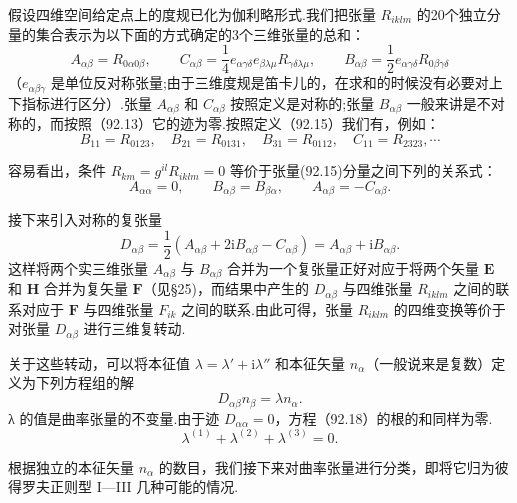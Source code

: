 假设四维空间给定点上的度规已化为伽利略形式.我们把张量 $R_{iklm}$ 的20个独立分量的集合表示为以下面的方式确定的3个三维张量的总和：
\begin{equation}
  A_{\alpha\beta}=R_{0\alpha 0\beta},\qquad
  C_{\alpha\beta}=\frac{1}{4}e_{\alpha\gamma\delta}e_{\beta\lambda\mu}
  R_{\gamma\delta\lambda\mu},\qquad
  B_{\alpha\beta}=\frac{1}{2}e_{\alpha\gamma\delta}R_{0\beta\gamma\delta}
\end{equation}
（$e_{\alpha\beta\gamma}$ 是单位反对称张量;由于三维度规是笛卡儿的，在求和的时候没有必要对上下指标进行区分）.张量 $A_{\alpha\beta}$ 和 $C_{\alpha\beta}$ 按照定义是对称的;张量 $B_{\alpha\beta}$ 一般来讲是不对称的，而按照（92.13）它的迹为零.按照定义（92.15）我们有，例如：
\begin{equation*}
  B_{11}=R_{0123},\quad B_{21}=R_{0131},\quad
  B_{31}=R_{0112},\quad C_{11}=R_{2323},\cdots
\end{equation*}

容易看出，条件 $R_{km}=g^{il}R_{iklm}=0$ 等价于张量(92.15)分量之间下列的关系式：
\begin{equation}
  A_{\alpha\alpha}=0,\qquad B_{\alpha\beta}=B_{\beta\alpha},\qquad
  A_{\alpha\beta}=-C_{\alpha\beta}.
\end{equation}

接下来引入对称的复张量
\begin{equation}
  D_{\alpha\beta}=\frac{1}{2}\left(A_{\alpha\beta}
  +2\mathrm{i}B_{\alpha\beta}-C_{\alpha\beta}\right)
  =A_{\alpha\beta}+\mathrm{i}B_{\alpha\beta}.
\end{equation}
这样将两个实三维张量 $A_{\alpha\beta}$ 与 $B_{\alpha\beta}$ 合并为一个复张量正好对应于将两个矢量 $\boldsymbol{E}$ 和 $\boldsymbol{H}$ 合并为复矢量 $\boldsymbol{F}$（见§25)，而结果中产生的 $D_{\alpha\beta}$ 与四维张量 $R_{iklm}$ 之间的联系对应于 $\boldsymbol{F}$ 与四维张量 $F_{ik}$ 之间的联系.由此可得，张量 $R_{iklm}$ 的四维变换等价于对张量 $D_{\alpha\beta}$ 进行三维复转动.

关于这些转动，可以将本征值 $\lambda=\lambda'+\mathrm{i}\lambda''$ 和本征矢量 $n_{\alpha}$（一般说来是复数）定义为下列方程组的解
\begin{equation}
  D_{\alpha\beta}n_{\beta}=\lambda n_{\alpha}.
\end{equation}
λ 的值是曲率张量的不变量.由于迹 $D_{\alpha\alpha}=0$，方程（92.18）的根的和同样为零.
\begin{equation*}
  \lambda^{(1)}+\lambda^{(2)}+\lambda^{(3)}=0.
\end{equation*}

根据独立的本征矢量 $n_{\alpha}$ 的数目，我们接下来对曲率张量进行分类，即将它归为彼得罗夫正则型 I—III 几种可能的情况.

